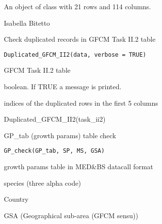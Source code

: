 \documentclass[a4paper]{book}
\begin{document}
%
\begin{Format}
An object of class  with 21 rows and 114 columns.
\end{Format}
%
\begin{Author}\relax
Isabella Bitetto 
\end{Author}
%
\begin{Description}\relax
Check duplicated records in GFCM Task II.2 table
\end{Description}
%
\begin{Usage}
\begin{verbatim}
Duplicated_GFCM_II2(data, verbose = TRUE)
\end{verbatim}
\end{Usage}
%
\begin{Arguments}
\begin{ldescription}
\item[\code{data}] GFCM Task II.2 table

\item[\code{verbose}] boolean. If TRUE a message is printed.
\end{ldescription}
\end{Arguments}
%
\begin{Value}
indices of the duplicated rows in the first 5 columns
\end{Value}
%
\begin{Examples}
\begin{ExampleCode}
Duplicated_GFCM_II2(task_ii2)
\end{ExampleCode}
\end{Examples}
%
\begin{Description}\relax
GP\_tab (growth params) table check
\end{Description}
%
\begin{Usage}
\begin{verbatim}
GP_check(GP_tab, SP, MS, GSA)
\end{verbatim}
\end{Usage}
%
\begin{Arguments}
\begin{ldescription}
\item[\code{GP\_tab}] growth params table in MED\&BS datacall format

\item[\code{SP}] species (three alpha code)

\item[\code{MS}] Country

\item[\code{GSA}] GSA (Geographical sub-area (GFCM sensu))
\end{ldescription}
\end{Arguments}
\end{document}
